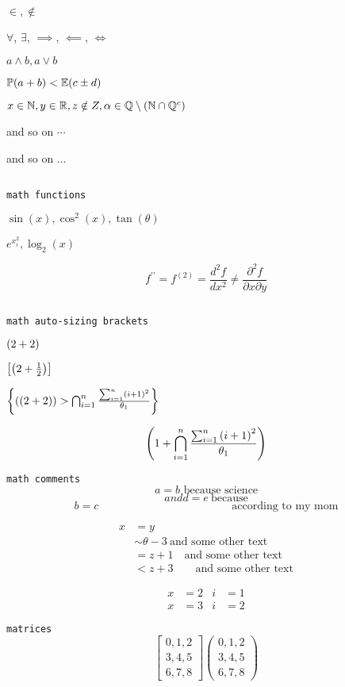 \documentclass[11pt, oneside]{article}   	%
\begin{document}
$\in, \notin$

$\forall$, $\exists$, $\implies$, $\impliedby$, $\iff$

$a \land b, a \lor b$

$\mathbb{P}(a+b) < \mathbb{E}(c \pm d)$

$x \in \mathbb{N}, y \in \mathbb{R}, z \notin Z, \alpha \in \mathbb{Q}\setminus(\mathbb{N} \cap \mathbb{Q}^c)$

and so on $\cdots$

and so on $\ldots$

$\ $

\texttt{math functions}

$\sin(x), \cos^2(x), \tan(\theta)$

$e^{x_i^2}, \log_2(x)$

\[ f^{\prime\prime} = f^{(2)} = \frac{d^2 f}{dx^2} \ne \frac{\partial^2 f}{\partial x \partial y} \]

$\ $

\texttt{math auto-sizing brackets}

$\left( 2+2 \right)$

$\left[ \left( 2+\frac{1}{2} \right) \right]$

$\left\{ \left( \left( 2 + 2 \right) \right) > \bigcap_{i=1}^n \frac{\sum_{i=1}^n \left( i +1 \right)^2}{\theta_1} \right \}$

\[ \left( 1 + \bigcap_{i=1}^n \frac{\sum_{i=1}^n \left( i +1 \right)^2}{\theta_1} \right) \]

\newpage

\texttt{math comments}
\[ a = b \text{ because science} \]
\[ and d = e \ \text{because} \]
\[ b = c \hspace{2in} \text{according to my mom} \]

\begin{align*}
x &= y \\
&\sim \theta - 3 \ \text{and some other text} \\
&= z + 1 \quad \text{and some other text} \\
&< z + 3 \qquad \text{and some other text}
\end{align*}

\begin{align*}
x &= 2 & i &= 1 \\
x &= 3 & i &= 2
\end{align*}

\texttt{matrices}
\[
\begin{bmatrix}
    0,1,2 \\
    3,4,5 \\
    6,7,8 
\end{bmatrix}
\begin{pmatrix}
    0,1,2 \\
    3,4,5 \\
    6,7,8
    \end{pmatrix}
\]
\end{document}
